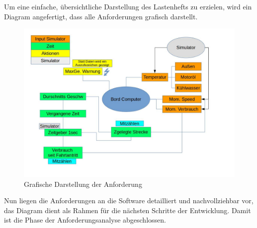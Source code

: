 \documentclass[a4paper,12pt]{article}
\begin{document}
Um eine einfache, übersichtliche Darstellung des Lastenhefts zu erzielen, wird ein Diagram angefertigt, dass alle Anforderungen grafisch darstellt.

\begin{figure}[!ht]

\begin{center}
\includegraphics[scale=0.55]{Requirements_v2.jpg}
\caption{Grafische Darstellung der Anforderung}
\end{center}

\end{figure}

Nun liegen die Anforderungen an die Software detailliert und nachvollziehbar vor, das Diagram dient als Rahmen für die nächsten Schritte der Entwicklung. Damit ist die Phase der Anforderungsanalyse abgeschlossen.
\end{document}
